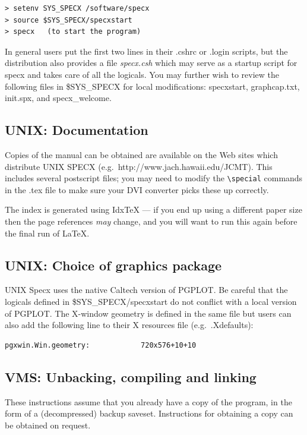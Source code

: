 \documentclass[11pt,twoside]{report}
\begin{document}
\begin{verbatim}
> setenv SYS_SPECX /software/specx
> source $SYS_SPECX/specxstart
> specx   (to start the program)
\end{verbatim}

In general users put the first two lines in their .cshrc or .login
scripts, but the distribution also provides a file {\em specx.csh}
which may serve as a startup script for specx and takes care of all
the logicals. You may further wish to review the following files in
\$SYS\_SPECX for local modifications: specxstart, graphcap.txt, init.spx,
and specx\_welcome.

\subsection{UNIX: Documentation}

Copies of the manual can be obtained are available on the
Web sites which distribute UNIX SPECX (e.g.\ http://www.jach.hawaii.edu/JCMT).
This includes several postscript files; you may need to modify the
\verb+\special+ commands in the .tex file to make sure your DVI
converter picks these up correctly.

The index is generated using Idx{\TeX} --- if you end up using a
different paper size then the page references {\em may} change, and
you will want to run this again before the final run of \LaTeX.


\subsection{UNIX: Choice of graphics package}

UNIX Specx uses the native Caltech version of PGPLOT. Be careful that
the logicals defined in \$SYS\_SPECX/specxstart do not conflict with
a local version of PGPLOT. The X-window geometry is defined in 
the same file but users can also add the following line to their X
resources file (e.g.\ .Xdefaults): 
\begin{verbatim}
pgxwin.Win.geometry:            720x576+10+10
\end{verbatim}

\subsection{VMS: Unbacking, compiling and linking}

These instructions assume that you already have a copy of the program, in the
form of a (decompressed) backup saveset. Instructions for obtaining a copy
can be obtained on request.
\end{document}
